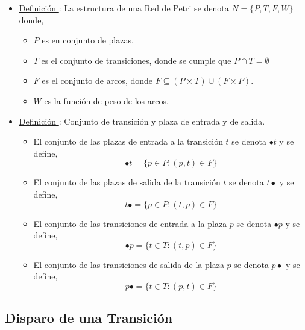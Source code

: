 \begin{itemize}
  En la figura \ref{fig:transiciones_no_sensibilizadas} se observa gráficamente esta definición mediante dos casos de transiciones no sensibilizadas. Nótese
  el peso de los arcos.

  \begin{figure}[h]
    \centering
    \texttt{[image: Transiciones\_No\_Sensibilizadas]}
    \caption{Ejemplos de transiciones no sensibilizadas.}
    \label{fig:transiciones_no_sensibilizadas}
  \end{figure}
  
  \item \underline{Definición \thedefinitionsCounter}: La estructura de una Red de Petri
  se denota $ N = \{P, T, F, W\} $ donde,
  \begin{itemize}
    \item $P$ es en conjunto de plazas.
    \item $T$ es el conjunto de transiciones, donde se cumple que $ P \cap T =
    \emptyset $
    \item $F$ es el conjunto de arcos, donde $ F \subseteq (P
    \times T) \cup (F \times P) $.
    \item $W$ es la función de peso de los arcos.
  \end{itemize}

  \item \underline{Definición \thedefinitionsCounter}: Conjunto de transición y plaza de entrada y
  de salida.
  \begin{itemize}
    \item[] El conjunto de las plazas de entrada a la transición $t$ se denota
    $\bullet t$ y se define,
    $$ \bullet t = \{ p \in P : (p, t) \in F \} $$
    \item[] El conjunto de las plazas de salida de la transición $t$ se denota $
    t \bullet$ y se define,
    $$ t \bullet = \{ p \in P : (t, p) \in F \} $$
    \item[] El conjunto de las transiciones de entrada a la plaza $p$ se
    denota $\bullet p$ y se define,
    $$ \bullet p = \{ t \in T : (t, p) \in F \} $$
    \item[] El conjunto de las transiciones de salida de la plaza $p$ se denota
    $ p \bullet$ y se define,
    $$ p \bullet = \{ t \in T : (p, t) \in F \} $$
  \end{itemize}
\end{itemize}

\subsection{Disparo de una Transición}

